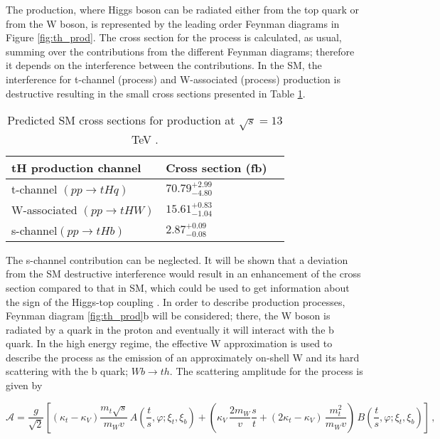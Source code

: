 The \tH production, where Higgs boson can be radiated either from the top quark or from the W boson, is represented by the leading order Feynman diagrams in Figure \ref{fig:th_prod}. The cross section for the \tH process is calculated, as usual, summing over the contributions from the different Feynman diagrams; therefore it depends on the interference between the contributions. In the SM, the interference for t-channel (\tHq process)  and W-associated (\tHW process) production is destructive \cite{maltoni1} resulting in the small cross sections presented in Table \ref{tab:th_xsec}. 
\begin{center}
\begin{table}[h]
\centering
\begin{tabular}{lll}\hline
tH production channel       & Cross section (fb)      \\\hline
t-channel $(pp \to tHq)$    & $70.79^{+2.99}_{-4.80}$ \\
W-associated $(pp \to tHW)$ & $15.61^{+0.83}_{-1.04}$ \\
s-channel$(pp \to tHb)$     & $ 2.87^{+0.09}_{-0.08}$ \\\hline
\end{tabular}
\caption[Predicted SM cross sections for \tH production at $\sqrt{s}=13$ TeV.]{Predicted SM cross sections for \tH production at $\sqrt{s}=13$ TeV \cite{thqw_xsec, thb_xsec}.}\label{tab:th_xsec}
\end{table}
\end{center}

The s-channel contribution can be neglected. It will be shown that a deviation from the SM destructive interference would result in an enhancement of the \tH cross section compared to that in SM, which could be used to get information about the sign of the Higgs-top coupling \cite{farina,tait}. In order to describe \tH production processes, Feynman diagram \ref{fig:th_prod}b will be considered; there, the W boson is radiated by a quark in the proton and eventually it will interact with the b quark. In the high energy regime, the effective W approximation \cite{dawson} is used to describe the process as the emission of an approximately on-shell W and its hard scattering with the b quark; \ie $Wb \to th$. The scattering amplitude for the process is given by

\begin{equation} \label{s_amp}
\mathcal{A}= \frac{g}{\sqrt{2}}\left[(\kappa_t-\kappa_V)\frac{m_t\sqrt{s}}{m_Wv}\,A\left(\frac{t}{s},\varphi; \xi_{t},\xi_{b}\right)+\left(\kappa_V\,\frac{2m_W}{v}\frac{s}{t}+(2\kappa_t-\kappa_V)\,\frac{m_t^{2}}{m_Wv}\right)\,B\left(\frac{t}{s},\varphi; \xi_{t},\xi_{b}\right)\right]\,,
\end{equation}

